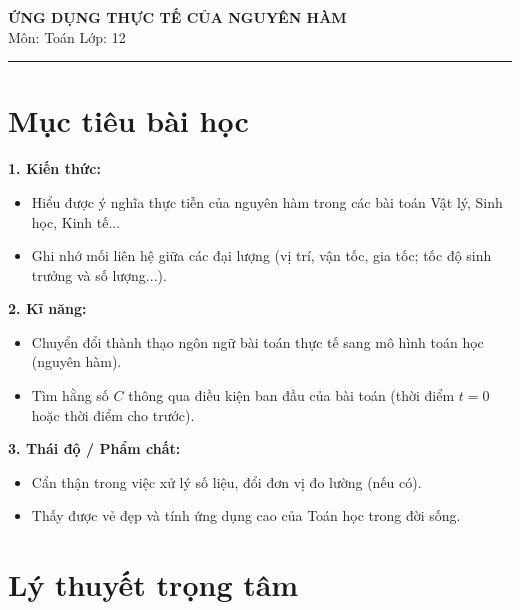 \documentclass[12pt]{article}
\begin{document}
	
	\begin{center}
		{\LARGE \textbf{ỨNG DỤNG THỰC TẾ CỦA NGUYÊN HÀM}}\\[4pt]
		{\large Môn: Toán \quad Lớp: 12}
	\end{center}
	\vspace{4mm}
	\hrule
	\vspace{4mm}
	
	\section*{Mục tiêu bài học}
	
	\textbf{1. Kiến thức:}
	\begin{itemize}
		\item Hiểu được ý nghĩa thực tiễn của nguyên hàm trong các bài toán Vật lý, Sinh học, Kinh tế...
		\item Ghi nhớ mối liên hệ giữa các đại lượng (vị trí, vận tốc, gia tốc; tốc độ sinh trưởng và số lượng...).
	\end{itemize}
	
	\noindent \textbf{2. Kĩ năng:}
	\begin{itemize}
		\item Chuyển đổi thành thạo ngôn ngữ bài toán thực tế sang mô hình toán học (nguyên hàm).
		\item Tìm hằng số $C$ thông qua điều kiện ban đầu của bài toán (thời điểm $t = 0$ hoặc thời điểm cho trước).
	\end{itemize}
	
	\noindent \textbf{3. Thái độ / Phẩm chất:}
	\begin{itemize}
		\item Cẩn thận trong việc xử lý số liệu, đổi đơn vị đo lường (nếu có).
		\item Thấy được vẻ đẹp và tính ứng dụng cao của Toán học trong đời sống.
	\end{itemize}
	
	\newpage
	
	\setcounter{tocdepth}{2}
	\tableofcontents
	\newpage
	
	\section{Lý thuyết trọng tâm}
	
\end{document}
